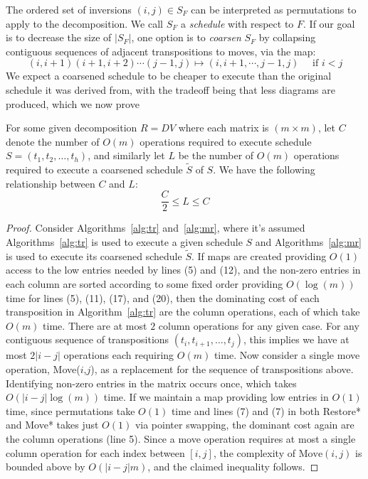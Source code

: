 \documentclass{siamart190516}
\begin{document}
The ordered set of inversions $(i,j) \in S_F$ can be interpreted as permutations to apply to the decomposition. We call $S_F$ a \emph{schedule} with respect to $F$. If our goal is to decrease the size of $\lvert S_F \rvert$, one option is to \emph{coarsen} $S_F$ by collapsing contiguous sequences of adjacent transpositions to moves, via the map:
\begin{equation}\label{eq:tr_to_mv}
	 (i, i+1)(i+1, i+2)\cdots(j-1, j) \mapsto (i, i+1, \cdots, j-1, j)  \quad \text{ if } i < j
\end{equation}
We expect a coarsened schedule to be cheaper to execute than the original schedule it was derived from, with the tradeoff being that less diagrams are produced, which we now prove
\begin{proposition}\label{prop:factor2}
	For some given decomposition $R = D V$ where each matrix is $(m \times m)$, let $C$ denote the number of $O(m)$ operations required to execute schedule $S  = (t_1, t_2, \dots, t_h)$, and similarly let $L$ be the number of $O(m)$ operations required to execute a coarsened schedule $\widetilde{S}$ of $S$. We have the following relationship between $C$ and $L$:
	$$ \frac{C}{2} \leq L \leq C$$ 
\end{proposition}
\begin{proof}
	Consider Algorithms~\ref{alg:tr} and~\ref{alg:mr}, where it's assumed Algorithms~\ref{alg:tr} is used to execute a given schedule $S$ and Algorithms~\ref{alg:mr} is used to execute its coarsened schedule $\widetilde{S}$. If maps are created providing $O(1)$ access to the low entries needed by lines (5) and (12), and the non-zero entries in each column are sorted according to some fixed order providing $O(\log(m))$ time for lines (5), (11), (17), and (20), then the dominating cost of each transposition in Algorithm~\ref{alg:tr} are the column operations, each of which take $O(m)$ time. There are at most $2$ column operations for any given case. For any contiguous sequence of transpositions $(t_i, t_{i{+}1}, \dots, t_j)$, this implies we have at most $2\lvert i - j \rvert$ operations each requiring $O(m)$ time. Now consider a single move operation, Move($i$,$j$), as a replacement for the sequence of transpositions above. Identifying non-zero entries in the matrix occurs once, which takes $O(\lvert i - j \rvert \log(m))$ time. If we maintain a map providing low entries in $O(1)$ time, since permutations take $O(1)$ time and lines (7) and (7) in both Restore* and Move* takes just $O(1)$ via pointer swapping, the dominant cost again are the column operations (line 5). Since a move operation requires at most a single column operation for each index between $[i, j]$, the complexity of $\mathrm{Move}(i,j)$ is bounded above by $O(\lvert i - j \rvert m)$, and the claimed inequality follows. 
\end{proof}
\end{document}
